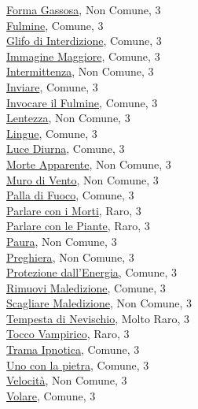 \begin{multicols}{3}
{{\hyperlink{Forma Gassosa}{Forma Gassosa}, Non Comune, 3\\
\hyperlink{Fulmine}{Fulmine}, Comune, 3\\
\hyperlink{Glifo di Interdizione}{Glifo di Interdizione}, Comune, 3\\
\hyperlink{Immagine Maggiore}{Immagine Maggiore}, Comune, 3\\
\hyperlink{Intermittenza}{Intermittenza}, Non Comune, 3\\
\hyperlink{Inviare}{Inviare}, Comune, 3\\
\hyperlink{Invocare il Fulmine}{Invocare il Fulmine}, Comune, 3\\
\hyperlink{lentezza}{Lentezza}, Non Comune, 3\\
\hyperlink{Lingue}{Lingue}, Comune, 3\\
\hyperlink{Luce Diurna}{Luce Diurna}, Comune, 3\\
\hyperlink{Morte Apparente}{Morte Apparente}, Non Comune, 3\\
\hyperlink{Muro di Vento}{Muro di Vento}, Non Comune, 3\\
\hyperlink{Palla di Fuoco}{Palla di Fuoco}, Comune, 3\\
\hyperlink{Parlare con i Morti}{Parlare con i Morti}, Raro, 3\\
\hyperlink{Parlare con le Piante}{Parlare con le Piante}, Raro, 3\\
\hyperlink{Paura}{Paura}, Non Comune, 3\\
\hyperlink{Preghiera}{Preghiera}, Non Comune, 3\\
\hyperlink{Protezione dall'Energia}{Protezione dall'Energia}, Comune, 3\\
\hyperlink{Rimuovi Maledizione}{Rimuovi Maledizione}, Comune, 3\\
\hyperlink{Scagliare Maledizione}{Scagliare Maledizione}, Non Comune, 3\\
\hyperlink{Tempesta di Nevischio}{Tempesta di Nevischio}, Molto Raro, 3\\
\hyperlink{Tocco Vampirico}{Tocco Vampirico}, Raro, 3\\
\hyperlink{Trama Ipnotica}{Trama Ipnotica}, Comune, 3\\
\hyperlink{Uno con la pietra}{Uno con la pietra}, Comune, 3\\
\hyperlink{Velocità}{Velocità}, Non Comune, 3\\
\hyperlink{Volare}{Volare}, Comune, 3\\

}}
\end{multicols}
